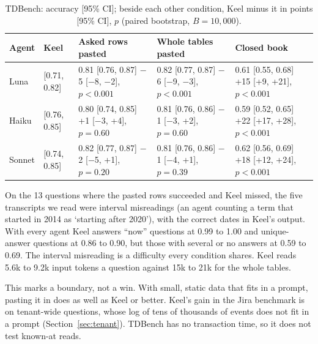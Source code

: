 \documentclass{article}
\begin{document}
\begin{table}[htbp]
\caption{TDBench: accuracy [95\% CI]; beside each other condition, Keel minus it in points [95\% CI], $p$ (paired bootstrap, $B = 10{,}000$).}
\label{tab:tdbench}
\centering
\footnotesize
\begin{tabularx}{\textwidth}{l >{\raggedright\arraybackslash}X l l l}
\toprule
Agent & Keel & Asked rows pasted & Whole tables pasted & Closed book \\
\midrule
Luna & 0.76 [0.71, 0.82] & \makecell[l]{0.81 [0.76, 0.87]\\ $-$5 [$-$8, $-$2], $p < 0.001$} & \makecell[l]{0.82 [0.77, 0.87]\\ $-$6 [$-$9, $-$3], $p < 0.001$} & \makecell[l]{0.61 [0.55, 0.68]\\ +15 [+9, +21], $p < 0.001$} \\
\addlinespace
Haiku & 0.81 [0.76, 0.85] & \makecell[l]{0.80 [0.74, 0.85]\\ +1 [$-$3, +4], $p = 0.60$} & \makecell[l]{0.81 [0.76, 0.86]\\ $-$1 [$-$3, +2], $p = 0.60$} & \makecell[l]{0.59 [0.52, 0.65]\\ +22 [+17, +28], $p < 0.001$} \\
\addlinespace
Sonnet & 0.80 [0.74, 0.85] & \makecell[l]{0.82 [0.77, 0.87]\\ $-$2 [$-$5, +1], $p = 0.20$} & \makecell[l]{0.81 [0.76, 0.86]\\ $-$1 [$-$4, +1], $p = 0.39$} & \makecell[l]{0.62 [0.56, 0.69]\\ +18 [+12, +24], $p < 0.001$} \\
\bottomrule
\end{tabularx}
\end{table}

On the 13 questions where the pasted rows succeeded and Keel missed, the five transcripts we read were interval misreadings (an agent counting a term that started in 2014 as `starting after 2020'), with the correct dates in Keel's output. With every agent Keel answers ``now'' questions at 0.99 to 1.00 and unique-answer questions at 0.86 to 0.90, but those with several or no answers at 0.59 to 0.69. The interval misreading is a difficulty every condition shares. Keel reads 5.6k to 9.2k input tokens a question against 15k to 21k for the whole tables.

This marks a boundary, not a win. With small, static data that fits in a prompt, pasting it in does as well as Keel or better. Keel's gain in the Jira benchmark is on tenant-wide questions, whose log of tens of thousands of events does not fit in a prompt (Section~\ref{sec:tenant}). TDBench has no transaction time, so it does not test known-at reads.
\end{document}
